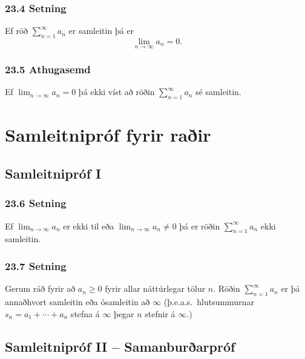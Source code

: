 %

\pause

 \subsubsection{23.4 Setning} 
Ef röð  $\sum_{n=1}^\infty a_n$ er samleitin þá er 
$$\lim_{n\rightarrow\infty}a_n=0.$$
 

\pause

\subsubsection{23.5 Athugasemd}
 Ef $\lim_{n \to \infty} a_n = 0$ þá  ekki víst að 
röðin $\sum_{n=1}^\infty a_n$ sé samleitin.




\section*{Samleitnipróf fyrir raðir}

\subsection[t]{Samleitnipróf I}
 \subsubsection{23.6 Setning}
Ef $\lim_{n\rightarrow\infty}a_n$ er ekki til eða 
$\lim_{n\rightarrow\infty}a_n\neq 0$ \pause þá er röðin 
$\sum_{n=1}^\infty a_n$ ekki samleitin.
 
%

 \subsubsection{23.7 Setning} 
Gerum ráð fyrir að $a_n\geq 0$ fyrir allar náttúrlegar tölur $n$. \pause
Röðin $\sum_{n=1}^\infty a_n$ er þá annaðhvort samleitin eða 
ósamleitin að $\infty$ (þ.e.a.s.~hlutsummurnar 
$s_n=a_1+\cdots+a_n$ stefna á
$\infty$ þegar $n$ stefnir á $\infty$.)
 


\subsection[t]{Samleitnipróf II -- Samanburðarpróf}
